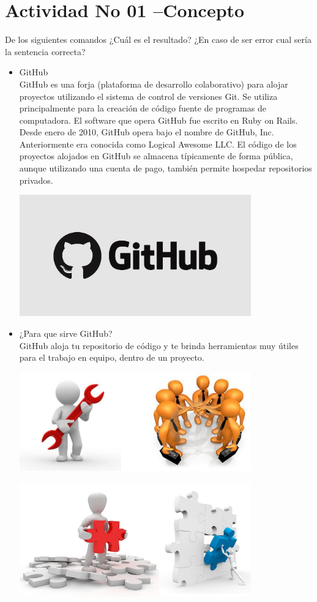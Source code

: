 \section{Actividad No 01 –Concepto} 
De los siguientes comandos ¿Cuál es el resultado? ¿En caso de ser error cual sería la sentencia correcta?

\begin{itemize}
	\item GitHub
	\\GitHub es una forja (plataforma de desarrollo colaborativo) para alojar proyectos utilizando el sistema de control de versiones Git. Se utiliza principalmente para la 	creación de código fuente de programas de computadora. El software que opera GitHub fue escrito en Ruby on Rails. Desde enero de 2010, GitHub opera bajo el 		nombre de GitHub, Inc. Anteriormente era conocida como Logical Awesome LLC. El código de los proyectos alojados en GitHub se almacena típicamente de forma 		pública, aunque utilizando una cuenta de pago, también permite hospedar repositorios privados.


	\begin{center}
	\includegraphics[width=10cm]{./Imagenes/github} 
	\end{center}


	\item ¿Para que sirve GitHub?
	\\GitHub aloja tu repositorio de código y te brinda herramientas muy útiles para el trabajo en equipo, dentro de un proyecto.
	\begin{center}
	\includegraphics[width=10cm]{./Imagenes/1} 
	\end{center}

	
	\begin{center}
	\includegraphics[width=10cm]{./Imagenes/2} 
	\end{center}

	

\end{itemize} 